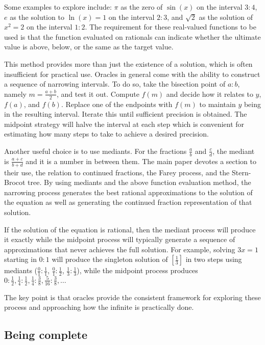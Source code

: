 \documentclass[12pt]{article}
\theoremstyle{remark}
\begin{document}
Some examples to explore include: $\pi$ as the zero of $\sin(x)$ on the interval $3:4$, $e$ as the solution to  $\ln(x)=1$ on the interval $2:3$, and $\sqrt{2}$ as the solution of $x^2 = 2$ on the interval $1:2$. The requirement for these real-valued functions to be used is that the function evaluated on rationals can indicate whether the ultimate value is above, below, or the same as the target value. 

This method provides more than just the existence of a solution, which is often insufficient for practical use. Oracles in general come with the ability to construct a sequence of narrowing intervals. To do so, take the bisection point of $a:b$, namely $m =\frac{a+b}{2}$, and test it out. Compute $f(m)$ and decide how it relates to $y$, $f(a)$, and $f(b)$. Replace one of the endpoints with $f(m)$ to maintain $y$ being in the resulting interval. Iterate this until sufficient precision is obtained.  The midpoint strategy will halve the interval at each step which is convenient for estimating how many steps to take to achieve a desired precision. 

Another useful choice is to use mediants. For the fractions $\frac{a}{b}$ and $\frac{c}{d}$, the mediant is $\frac{a+c}{b+d}$ and it is a number in between them. The main paper devotes a section to their use, the relation to continued fractions, the Farey process, and the Stern-Brocot tree. By using mediants and the above function evaluation method, the narrowing process generates the best rational approximations to the solution of the equation as well as generating the continued fraction representation of that solution. 

If the solution of the equation is rational, then the mediant process will produce it exactly while the midpoint process will typically generate a sequence of approximations that never achieves the full solution. For example, solving $3x = 1$ starting in $0:1$ will produce the singleton solution of $[\frac{1}{3}]$ in two steps using mediants ($\frac{0}{1}:\frac{1}{1}$, $\frac{0}{1}:\frac{1}{2}$, $\frac{1}{3}:\frac{1}{3}$), while the midpoint process produces $0:\frac{1}{2}, \frac{1}{4}: \frac{1}{2}, \frac{1}{4}: \frac{3}{8}, \frac{5}{16}: \frac{3}{8}, \ldots$

The key point is that oracles provide the consistent framework for exploring these process and approaching how the infinite is practically done. 

\subsection{Being complete}
\end{document}
